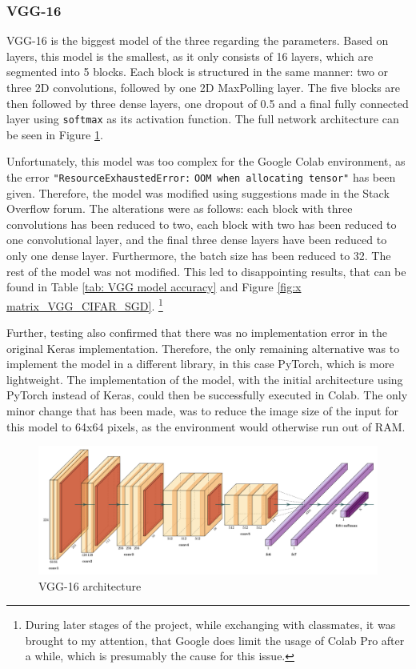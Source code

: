 \documentclass[conference]{IEEEtran}
\begin{document}
\subsubsection{VGG-16}
VGG-16 is the biggest model of the three regarding the parameters. 
Based on layers, this model is the smallest, as it only consists of 16 layers, which are segmented into 5 blocks. 
Each block is structured in the same manner: two or three 2D convolutions, followed by one 2D MaxPolling layer. 
The five blocks are then followed by three dense layers, one dropout of 0.5 and a final fully connected layer using \verb|softmax| as its activation function. 
The full network architecture can be seen in Figure \ref{fig:x VGG architecture}. \cite{simonyan_very_2015}

Unfortunately, this model was too complex for the Google Colab environment, as the error \verb|"ResourceExhaustedError:| \verb|OOM when allocating tensor"| has been given. 
Therefore, the model was modified using suggestions made in the Stack Overflow forum. \cite{gervais_answer_2019}
The alterations were as follows: each block with three convolutions has been reduced to two, each block with two has been reduced to one convolutional layer, and the final three dense layers have been reduced to only one dense layer. Furthermore, the batch size has been reduced to 32. 
The rest of the model was not modified. This led to disappointing results, that can be found in Table \ref{tab: VGG model accuracy} and Figure \ref{fig:x matrix_VGG_CIFAR_SGD}. \footnote{During later stages of the project, while exchanging with classmates, it was brought to my attention, that Google  does limit the usage of Colab Pro after a while, which is presumably the cause for this issue. }

Further, testing also confirmed that there was no implementation error in the original Keras implementation. 
Therefore, the only remaining alternative was to implement the model in a different library, in this case PyTorch, which is more lightweight.
The implementation of the model, with the initial architecture using PyTorch instead of Keras,  could then be successfully executed in Colab. 
The only minor change that has been made, was to reduce the image size of the input for this model to 64x64 pixels, as the environment would otherwise run out of RAM.

\begin{figure}[!htbp]
    \centering
    \includegraphics[scale=0.07]{img/VGG.png}
    \caption{VGG-16 architecture \cite{noauthor_forks_nodate}}
    \label{fig:x VGG architecture}
\end{figure}
\end{document}
